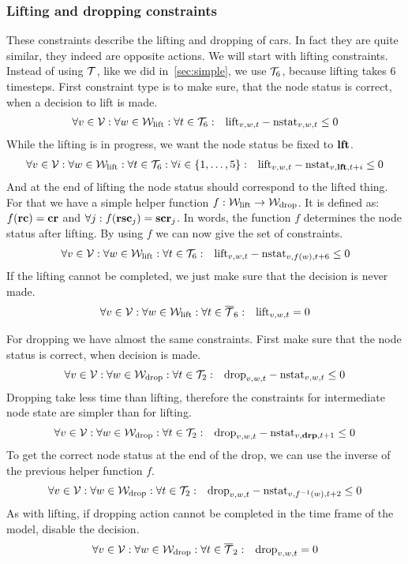 \subsubsection{Lifting and dropping constraints}
These constraints describe the lifting and dropping of cars. In fact they are
quite similar, they indeed are opposite actions. We will start with lifting
constraints. Instead of using $\mathcal{T}$, like we did in~\autoref{sec:simple}, we use
$\mathcal{T}_6$, because lifting takes 6 timesteps. First constraint type is to make sure,
that the node status is correct, when a decision to lift is made.
\begin{align}
    &\forall v \in \mathcal{V}: \forall w \in \mathcal{W}_\mathrm{lift}: \forall t \in \mathcal{T}_6: &\mathrm{lift}_{v,w,t} -
    \mathrm{nstat}_{v,w,t} \leq 0
\end{align}
While the lifting is in progress, we want the node status be fixed to
$\text{\bf lft}$.
\begin{align}
    &\forall v \in \mathcal{V}: \forall w \in \mathcal{W}_\mathrm{lift}: \forall t \in \mathcal{T}_6: \forall i \in
    \{1,\ldots,5\}: &\mathrm{lift}_{v,w,t} -
    \mathrm{nstat}_{v,\text{\bf lft},t+i} \leq 0
\end{align}
And at the end of lifting the node status should correspond to the lifted
thing. For that we have a simple helper function $f : \mathcal{W}_\mathrm{lift} \to \mathcal{W}_\mathrm{drop}$. It is
defined as: $f(\text{\bf rc}) = \text{\bf cr}$ and $\forall j: f(\text{\bf rsc}_j) =
\text{\bf scr}_j$. In words, the function $f$ determines the node status after
lifting. By using $f$ we can now give the set of constraints.
\begin{align}
    &\forall v \in \mathcal{V}: \forall w \in \mathcal{W}_\mathrm{lift}: \forall t \in \mathcal{T}_6: &\mathrm{lift}_{v,w,t} -
    \mathrm{nstat}_{v,f(w),t+6} \leq 0
\end{align}
If the lifting cannot be completed, we just make sure that the decision is
never made.
\begin{align}
    &\forall v \in \mathcal{V}: \forall w \in \mathcal{W}_\mathrm{lift}: \forall t \in \overline{\mathcal{T}}_6: &\mathrm{lift}_{v,w,t} =
    0
\end{align}

For dropping we have almost the same constraints. First make sure that the node
status is correct, when decision is made.
\begin{align}
    &\forall v \in \mathcal{V}: \forall w \in \mathcal{W}_\mathrm{drop}: \forall t \in \mathcal{T}_2: &\mathrm{drop}_{v,w,t} -
    \mathrm{nstat}_{v,w,t} \leq 0
\end{align}
Dropping take less time than lifting, therefore the constraints for
intermediate node state are simpler than for lifting.
\begin{align}
    &\forall v \in \mathcal{V}: \forall w \in \mathcal{W}_\mathrm{drop}: \forall t \in \mathcal{T}_2: &\mathrm{drop}_{v,w,t} -
    \mathrm{nstat}_{v,\text{\bf drp},t+1} \leq 0
\end{align}
To get the correct node status at the end of the drop, we can use the inverse
of the previous helper function $f$.
\begin{align}
    &\forall v \in \mathcal{V}: \forall w \in \mathcal{W}_\mathrm{drop}: \forall t \in \mathcal{T}_2: &\mathrm{drop}_{v,w,t} -
    \mathrm{nstat}_{v,f^{-1}(w),t+2} \leq 0
\end{align}
As with lifting, if dropping action cannot be completed in the time frame of
the model, disable the decision.
\begin{align}
    &\forall v \in \mathcal{V}: \forall w \in \mathcal{W}_\mathrm{drop}: \forall t \in \overline{\mathcal{T}}_2: &\mathrm{drop}_{v,w,t} =
    0
\end{align}


